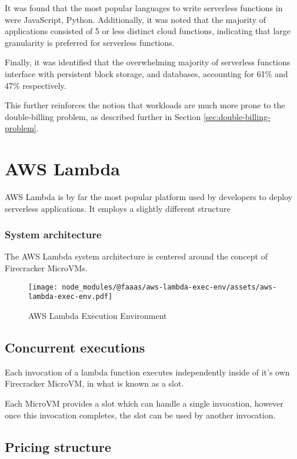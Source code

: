 It was found that the most popular languages to write serverless functions in were JavaScript, Python. Additionally, it was noted that the majority of applications consisted of 5 or less distinct cloud functions, indicating that large granularity is preferred for serverless functions.

Finally, it was identified that the overwhelming majority of serverless functions interface with persistent block storage, and databases, accounting for 61\% and 47\% respectively.

This further reinforces the notion that \faas{} workloads are much more prone to the double-billing problem, as described further in Section \ref{sec:double-billing-problem}.

\section{AWS Lambda}
AWS Lambda is by far the most popular\cite{eismannReviewServerlessUse2020,StateServerlessDatadog} \faas{} platform used by developers to deploy serverless applications. It employs a slightly different structure

\subsubsection{System architecture}

The AWS Lambda system architecture is centered around the concept of Firecracker MicroVMs\cite{agacheFirecrackerLightweightVirtualization2020}.

\begin{figure*}[t]
    \texttt{[image: node\_modules/@faaas/aws-lambda-exec-env/assets/aws-lambda-exec-env.pdf]}
    \caption{AWS Lambda Execution Environment}
    \label{fig:aws-lambda-exec-env}
\end{figure*}

\subsection{Concurrent executions}

Each invocation of a lambda function executes independently inside of it's own Firecracker MicroVM, in what is known as a slot.

Each MicroVM provides a slot which can handle a single invocation, however once this invocation completes, the slot can be used by another invocation.

\subsection{Pricing structure}

